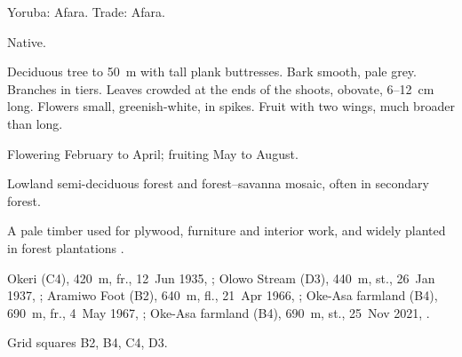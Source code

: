 \begin{center}
\end{center}

\label{sp:COM02}

 Yoruba: Afara. Trade: Afara.

 Native.

 Deciduous tree to 50~m with tall plank buttresses.
Bark smooth, pale grey. Branches in tiers. Leaves crowded at the ends
of the shoots, obovate, 6--12~cm long. Flowers small, greenish-white,
in spikes. Fruit with two wings, much broader than long.

 Flowering February to April; fruiting May to August.

 Lowland semi-deciduous forest and forest--savanna
mosaic, often in secondary forest.

 A pale timber used for plywood, furniture and interior
work, and widely planted in forest plantations
\citep{keay1989,louppe2008}.

 Okeri (C4), 420~m, fr., 12~Jun 1935, ;
Olowo Stream (D3), 440~m, st., 26~Jan 1937, ;
Aramiwo Foot (B2), 640~m, fl., 21~Apr 1966, ;
Oke-Asa farmland (B4), 690~m, fr., 4~May 1967, ;
Oke-Asa farmland (B4), 690~m, st., 25~Nov 2021, .

 Grid squares B2, B4, C4, D3.

\begin{center}
\end{center}
